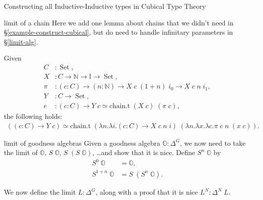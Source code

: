 \documentclass[runningheads]{llncs}
\DeclareMathOperator{\USet}{Set}
\newcommand{\N}{\mathbb{N}}
\newcommand{\II}{\mathbb{I}}
\newcommand{\bbO}{\mathbb{O}}
\begin{document}
{\begin{section}{Constructing all Inductive-Inductive types in Cubical Type Theory}
\begin{subsection}{limit of a chain}
Here we add one lemma about chains that we didn't need in \S\ref{example-construct-cubical}, but do need to handle infinitary parameters in \S\ref{limit-alg}.

\begin{lemma}
    Given \begin{align*}
    C &: \USet,\\
    X &: C \to \N \to \II \to \USet,\\
    \pi &: (c : C) \to (n : \N) \to X\;c\;(1+n)\;i_0 \to X\;c\;n\;i_1,\\
    Y &: C \to \USet,\\
    e &: (c : C) \to Y\;c \simeq \text{chain.t}\;(X\;c)\;(\pi\;c),
    \end{align*}
    the following holds:
    \begin{gather*}
    ((c : C) \to Y\;c) \simeq \text{chain.t}\;(\lambda n.\lambda i.(c : C) \to X\;c\;n\;i)\;(\lambda n.\lambda x.\lambda c. \pi\;c\;n\;(x\;c)).
    \end{gather*}
\end{lemma}

\end{subsection}
\begin{subsection}{limit of goodness algebras}\label{limit-alg}
Given a goodness algebra $\bbO : \Delta^G$, we now need to take the limit of $\bbO$, $S\;\bbO$, $S\;(S\;\bbO)$, \dots and show that it is nice.
Define $S^n\;\bbO$ by \begin{align*}S^0\;\bbO &= \bbO,\\ S^{1+n}\;\bbO &= S\;(S^n\;\bbO).\end{align*}

We now define the limit $L : \Delta^G$, along with a proof that it is nice $L^N : \Delta^N\;L$.


\end{subsection}
\end{section}}
\end{document}

